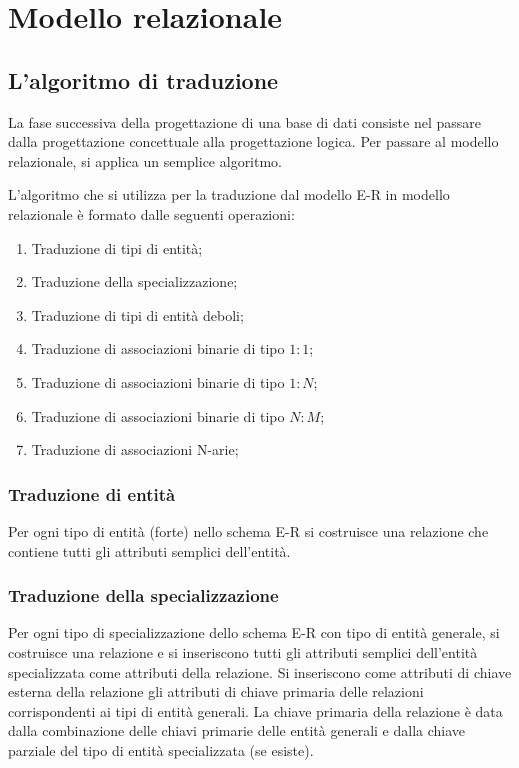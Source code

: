 
\chapter{Modello relazionale}
\label{cap:modello-relazionale}

\section{L'algoritmo di traduzione}
La fase successiva della progettazione di una base di dati consiste nel passare dalla progettazione concettuale alla progettazione logica. Per passare al modello relazionale, si applica un semplice algoritmo.

L'algoritmo che si utilizza per la traduzione dal modello E-R in modello relazionale è formato dalle seguenti operazioni:

\begin{enumerate}
	
	\item
	Traduzione di tipi di entità;
	
	\item
	Traduzione della specializzazione;
	
	\item
	Traduzione di tipi di entità deboli;
	
	\item
	Traduzione di associazioni binarie di tipo $1:1$;
	
	\item
	Traduzione di associazioni binarie di tipo $1:N$;
	
	\item
	Traduzione di associazioni binarie di tipo $N:M$;
	
	\item
	Traduzione di associazioni N-arie;

\end{enumerate}

\subsection{Traduzione di entità}
	Per ogni tipo di entità (forte) nello schema E-R si costruisce una relazione che contiene tutti gli attributi semplici dell'entità.

\subsection{Traduzione della specializzazione}
	Per ogni tipo di specializzazione dello schema E-R con tipo di entità generale, si costruisce una relazione e si inseriscono tutti gli attributi semplici dell'entità specializzata come attributi della relazione. Si inseriscono come attributi di chiave esterna della relazione gli attributi di chiave primaria delle relazioni corrispondenti ai tipi di entità generali. La chiave primaria della relazione è data dalla combinazione delle chiavi primarie delle entità generali e dalla chiave parziale del tipo di entità specializzata (se esiste).

